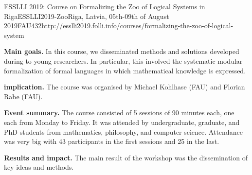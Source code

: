 \begin{event}{ESSLLI 2019: Course on Formalizing the Zoo of Logical Systems in Riga}{ESSLLI2019-Zoo}{Riga, Latvia, 05th-09th of August 2019}{FAU}{43}{2}{http://esslli2019.folli.info/courses/formalizing-the-zoo-of-logical-system}

\textbf{Main goals.}
In this course, we disseminated methods and solutions developed during \ODK to young researchers.
In particular, this involved the systematic modular formalization of formal languages in which mathematical knowledge is expressed.

\textbf{\ODK implication.}
The course was organised by Michael Kohlhase (FAU) and Florian Rabe (FAU).

\textbf{Event summary.}
The course consisted of 5 sessions of 90 minutes each, one each from Monday to Friday.
It was attended by undergraduate, graduate, and PhD students from mathematics, philosophy, and computer science.
Attendance was very big with 43 participants in the first sessions and 25 in the last.

\textbf{Results and impact.}
The main result of the workshop was the dissemination of key \ODK ideas and methods.
\end{event}
